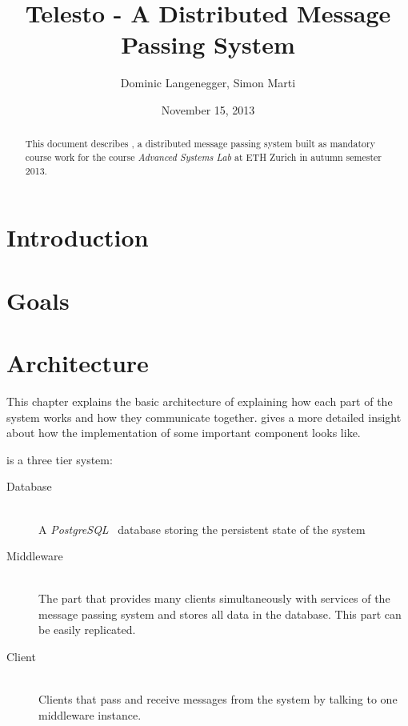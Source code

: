 \documentclass[a4paper, oneside]{csthesis}
\title{Telesto - A Distributed Message Passing System}
\author{Dominic Langenegger, Simon Marti}
\institute{Advanced Systems Lab 2013 \\[2pt]
Systems Group \\[2pt]
ETH Zürich}
\date{November 15, 2013}
\begin{document}
\frontmatter
\maketitle %

\cleardoublepage



\begin{abstract}
	This document describes \telesto, a distributed message passing system
	built as mandatory course work for the course {\it Advanced Systems Lab} at ETH
	Zurich in autumn semester 2013.
	
	
	
\end{abstract}

\tableofcontents

\mainmatter %

\chapter{Introduction}
	


\chapter{Goals}

	
\chapter{Architecture}
    This chapter explains the basic architecture of \telesto{} explaining how each
    part of the system works and how they communicate together.
     gives a more detailed insight about how the
    implementation of some important component looks like.

    \telesto{} is a three tier system:
    \begin{description}
        \item[Database] \ \\
            A {\it PostgreSQL}~ database storing the persistent state of the system
        \item[Middleware] \ \\
            The part that provides many clients simultaneously with services of
            the message passing system and stores all data in the database. This
            part can be easily replicated.
        \item[Client] \ \\
            Clients that pass and receive messages from the system by talking to
            one middleware instance.
    \end{description}
\end{document}
